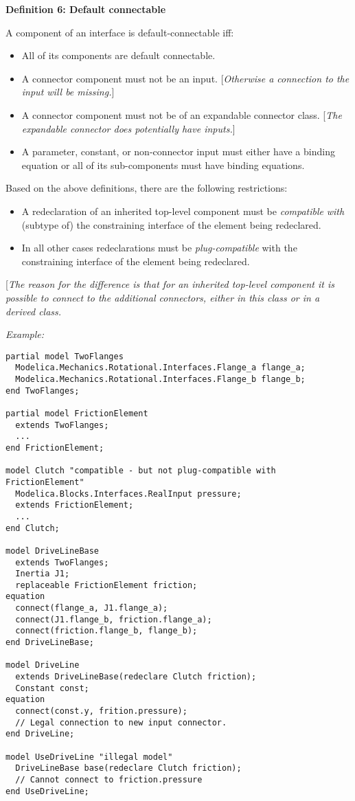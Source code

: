 \textbf{Definition 6: Default connectable}

A component of an interface is default-connectable iff:

\begin{itemize}
\item
  All of its components are default connectable.
\item
  A connector component must not be an input. {[}\emph{Otherwise a
  connection to the input will be missing.}{]}
\item
  A connector component must not be of an expandable connector class.
  {[}\emph{The expandable connector does potentially have inputs.}{]}
\item
  A parameter, constant, or non-connector input must either have a
  binding equation or all of its sub-components must have binding
  equations.
\end{itemize}

Based on the above definitions, there are the following restrictions:

\begin{itemize}
\item
  A redeclaration of an inherited top-level component must be
  \emph{compatible} \emph{with} (subtype of) the constraining interface
  of the element being redeclared.
\item
  In all other cases redeclarations must be \emph{plug-compatible} with
  the constraining interface of the element being redeclared.
\end{itemize}

{[}\emph{The reason for the difference is that for an inherited
top-level component it is possible to connect to the additional
connectors, either in this class or in a derived class.}

\emph{Example:}
\begin{lstlisting}[language=modelica]
partial model TwoFlanges
  Modelica.Mechanics.Rotational.Interfaces.Flange_a flange_a;
  Modelica.Mechanics.Rotational.Interfaces.Flange_b flange_b;
end TwoFlanges;

partial model FrictionElement
  extends TwoFlanges;
  ...
end FrictionElement;

model Clutch "compatible - but not plug-compatible with FrictionElement"
  Modelica.Blocks.Interfaces.RealInput pressure;
  extends FrictionElement;
  ...
end Clutch;

model DriveLineBase
  extends TwoFlanges;
  Inertia J1;
  replaceable FrictionElement friction;
equation
  connect(flange_a, J1.flange_a);
  connect(J1.flange_b, friction.flange_a);
  connect(friction.flange_b, flange_b);
end DriveLineBase;

model DriveLine
  extends DriveLineBase(redeclare Clutch friction);
  Constant const;
equation
  connect(const.y, frition.pressure);
  // Legal connection to new input connector.
end DriveLine;

model UseDriveLine "illegal model"
  DriveLineBase base(redeclare Clutch friction);
  // Cannot connect to friction.pressure
end UseDriveLine;
\end{lstlisting}

